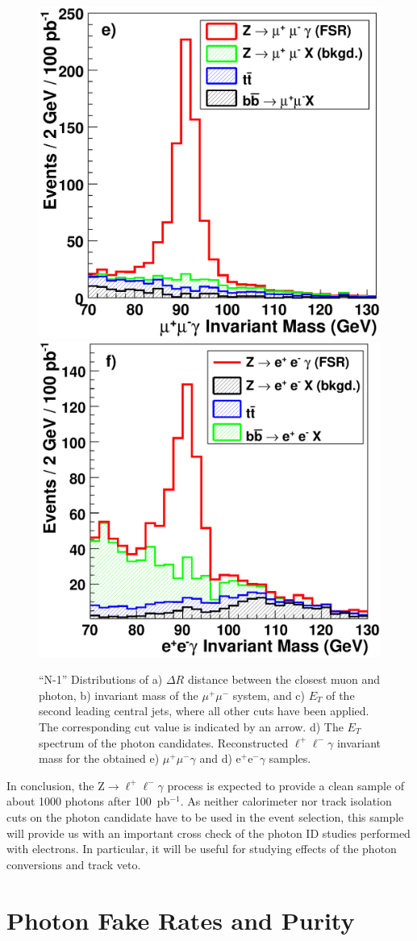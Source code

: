\documentclass{cmspaper}
\begin{document}
\begin{figure}[p]
\begin{center}
    \includegraphics[width=0.46\linewidth]{zgammafigs/mMMG.eps}
    \includegraphics[width=0.46\linewidth]{zgammafigs/meeg.eps} %
\caption{
``N-1'' Distributions of a) $\Delta R$ distance between the closest muon and photon, 
b) invariant mass of the $\mu^+\mu^-$ system, and c) $E_T$ of the second leading central
jets, where all other cuts have been applied. The corresponding cut value is indicated
by an arrow. d) The $E_T$ spectrum of the photon candidates. Reconstructed $\ell^+\ell^- \gamma$ invariant 
mass for the obtained e) $\mu^+\mu^-\gamma$ and d) $\mathrm{e}^+\mathrm{e}^-\gamma$ samples.
}
  \end{center}
\end{figure} \label{fig:llgamma}




In conclusion, the  $\mathrm{Z}\to \ell^+\ell^- \gamma$  process is expected to provide a clean sample
of about 1000 photons after 100~pb$^{-1}$. As neither calorimeter nor track isolation cuts on the
photon candidate have to be used in the event selection, this sample will provide us with an important
cross check of the photon ID studies performed with electrons. In particular, it will be useful
for studying effects of the photon conversions and track veto.

\section{Photon Fake Rates and Purity}
\end{document}
